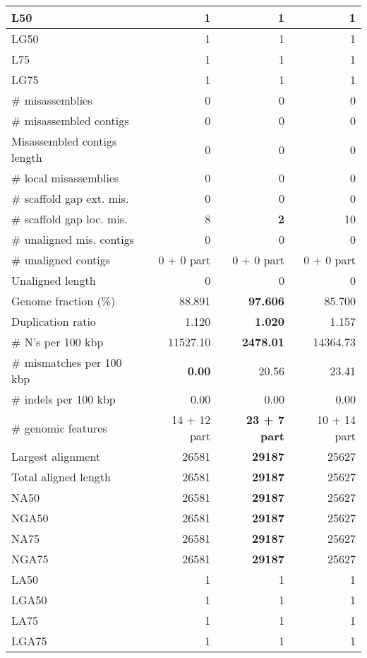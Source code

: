 \documentclass[12pt,a4paper]{article}
\begin{document}
\begin{table}[ht]
\begin{center}
\begin{tabular}{|l*{3}{|r}|}
L50 & 1 & 1 & 1 \\ \hline
LG50 & 1 & 1 & 1 \\ \hline
L75 & 1 & 1 & 1 \\ \hline
LG75 & 1 & 1 & 1 \\ \hline
\# misassemblies & 0 & 0 & 0 \\ \hline
\# misassembled contigs & 0 & 0 & 0 \\ \hline
Misassembled contigs length & 0 & 0 & 0 \\ \hline
\# local misassemblies & 0 & 0 & 0 \\ \hline
\# scaffold gap ext. mis. & 0 & 0 & 0 \\ \hline
\# scaffold gap loc. mis. & 8 & {\bf 2} & 10 \\ \hline
\# unaligned mis. contigs & 0 & 0 & 0 \\ \hline
\# unaligned contigs & 0 + 0 part & 0 + 0 part & 0 + 0 part \\ \hline
Unaligned length & 0 & 0 & 0 \\ \hline
Genome fraction (\%) & 88.891 & {\bf 97.606} & 85.700 \\ \hline
Duplication ratio & 1.120 & {\bf 1.020} & 1.157 \\ \hline
\# N's per 100 kbp & 11527.10 & {\bf 2478.01} & 14364.73 \\ \hline
\# mismatches per 100 kbp & {\bf 0.00} & 20.56 & 23.41 \\ \hline
\# indels per 100 kbp & 0.00 & 0.00 & 0.00 \\ \hline
\# genomic features & 14 + 12 part & {\bf 23 + 7 part} & 10 + 14 part \\ \hline
Largest alignment & 26581 & {\bf 29187} & 25627 \\ \hline
Total aligned length & 26581 & {\bf 29187} & 25627 \\ \hline
NA50 & 26581 & {\bf 29187} & 25627 \\ \hline
NGA50 & 26581 & {\bf 29187} & 25627 \\ \hline
NA75 & 26581 & {\bf 29187} & 25627 \\ \hline
NGA75 & 26581 & {\bf 29187} & 25627 \\ \hline
LA50 & 1 & 1 & 1 \\ \hline
LGA50 & 1 & 1 & 1 \\ \hline
LA75 & 1 & 1 & 1 \\ \hline
LGA75 & 1 & 1 & 1 \\ \hline
\end{tabular}
\end{center}
\end{table}
\end{document}
